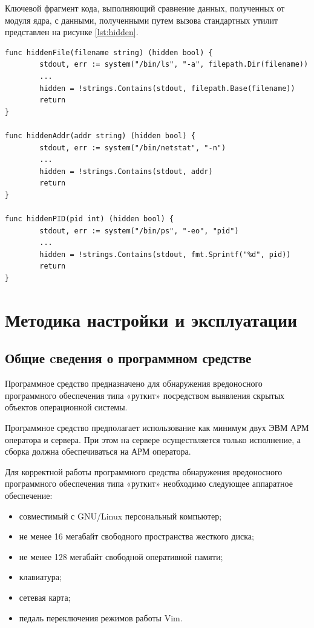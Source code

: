 \documentclass{gost7.32-2001}
\begin{document}
Ключевой фрагмент кода, выполняющий сравнение данных, полученных от
модуля ядра, с данными, полученными путем вызова стандартных утилит
представлен на рисунке \ref{lst:hidden}.

\begin{lstlisting}[caption={Сравнение данных},
    captionpos=b, float, label={lst:hidden}]
func hiddenFile(filename string) (hidden bool) {
        stdout, err := system("/bin/ls", "-a", filepath.Dir(filename))
        ...
        hidden = !strings.Contains(stdout, filepath.Base(filename))
        return
}

func hiddenAddr(addr string) (hidden bool) {
        stdout, err := system("/bin/netstat", "-n")
        ...
        hidden = !strings.Contains(stdout, addr)
        return
}

func hiddenPID(pid int) (hidden bool) {
        stdout, err := system("/bin/ps", "-eo", "pid")
        ...
        hidden = !strings.Contains(stdout, fmt.Sprintf("%d", pid))
        return
}
\end{lstlisting}

\newpage
\section{Методика настройки и эксплуатации}

\subsection{Общие cведения о программном средстве}

Программное средство предназначено для обнаружения вредоносного
программного обеспечения типа «руткит» посредством выявления скрытых
объектов операционной системы.

Программное средство предполагает использование как минимум двух ЭВМ
\dash АРМ оператора и сервера. При этом на сервере осуществляется
только исполнение, а сборка должна обеспечиваться на АРМ оператора.

Для корректной работы программного средства обнаружения вредоносного
программного обеспечения типа «руткит» необходимо следующее аппаратное
обеспечение:
\begin{itemize}
\item
  совместимый с GNU/Linux персональный компьютер;
\item
  не менее 16 мегабайт свободного пространства жесткого диска;
\item
  не менее 128 мегабайт свободной оперативной памяти;
\item
  клавиатура;
\item
  сетевая карта;
\item
  педаль переключения режимов работы Vim.
\end{itemize}
\end{document}
